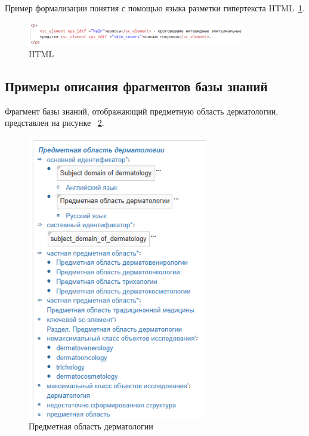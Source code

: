 Пример формализации понятия с помощью языка разметки гипертекста HTML~\ref{fig:sections/HTML}.
\begin{figure}[H]
	\centering
	\includegraphics[width=0.85\textwidth]{sections/html_hair.png}
	\caption{HTML}
	\label{fig:sections/HTML}
\end{figure}

\subsection{Примеры описания фрагментов базы знаний}
Фрагмент базы знаний, отображающий предметную область дерматологии$,$ представлен на рисунке
~\ref{fig:sections/subject_domain_of_dermatology}.
\begin{figure}[H]
	\centering
	\includegraphics[width=0.7\textwidth]{sections/subject_domain_of_dermatology.png}
	\caption{Предметная область дерматологии}
	\label{fig:sections/subject_domain_of_dermatology}
\end{figure}

